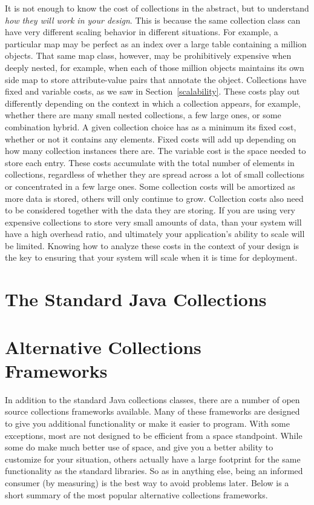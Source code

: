 It is not enough to know the cost
of collections in the abstract, but to understand \emph{how they will work in
your design}. This is because the same collection class can have very different
scaling behavior in different situations. For example, a particular map
may be perfect as an index over a large table containing a
million objects. That same map class, however, may be prohibitively expensive
when deeply nested, for example, when each of those
million objects maintains its own side map to store attribute-value pairs that
annotate the object.
Collections have fixed and variable costs, as we saw
in Section~\ref{scalability}. These costs play out differently
depending on the context in which a collection appears, for example, whether
there are many small nested collections, a few large ones, or some combination
hybrid.  A given collection choice has as a minimum its fixed cost,
whether or not it contains any elements. Fixed costs will add up depending on
how many collection instances there are. The variable cost is the space needed to store each entry. These
 costs accumulate with the total number of
elements in collections, regardless of whether they are spread across a lot of
small collections or concentrated in a few large ones. 
Some collection costs will be amortized as more data is stored, others will only
continue to grow. Collection costs also need to be considered together with the data they are
storing. If you are using very expensive collections to store very small amounts
of data, than your system will have a high overhead ratio, and ultimately your application's ability
to scale will be limited. 
Knowing how to analyze these costs in the context of your design
is the key to ensuring that your system will scale when it is time for
deployment.  

\section{The Standard Java Collections}
\section{Alternative Collections Frameworks}
In addition to the standard Java collections classes, there are a number of
open source collections frameworks available. Many of these frameworks
are designed to give you additional functionality or make it easier to
program. With some exceptions, most are not designed to be efficient from a
space standpoint. While some do make much better use of space, and give you a
better ability to customize for your situation, others actually have a
large footprint for the same functionality as the standard libraries. So as in
anything else, being an informed consumer (by measuring) is the best way to
avoid problems later. Below is a short summary of the most
popular alternative collections frameworks.

